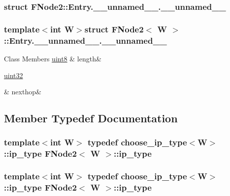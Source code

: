 \subsubsection{struct F\-Node2\-:\-:Entry.\-\_\-\-\_\-unnamed\-\_\-\-\_\-.\-\_\-\-\_\-unnamed\-\_\-\-\_\-}
\subsubsection*{template$<$int W$>$struct F\-Node2$<$ W $>$\-::\-Entry.\-\_\-\-\_\-unnamed\-\_\-\-\_\-.\-\_\-\-\_\-unnamed\-\_\-\-\_\-}

\begin{DoxyFields}{Class Members}
\hypertarget{structFNode2_a2fa47f7c65fec19cc163b195725e3844}{\hyperlink{types_8h_a34ecedcf03a70dc91e4616212d79267d}{uint8}}\label{structFNode2_a2fa47f7c65fec19cc163b195725e3844}
&
length&
\\
\hline

\hypertarget{structFNode2_acd89a5ed2bdc1b5e6183409f0c056ee2}{\hyperlink{types_8h_abd01e8e67e3d94cab04ecaaf4f85ac1b}{uint32}}\label{structFNode2_acd89a5ed2bdc1b5e6183409f0c056ee2}
&
nexthop&
\\
\hline

\end{DoxyFields}


\subsection{Member Typedef Documentation}
\hypertarget{structFNode2_ab28e88113ab341b42bc43259be0f7dd5}{
\subsubsection[{ip\-\_\-type}]{\setlength{\rightskip}{0pt plus 5cm}template$<$int W$>$ typedef {\bf choose\-\_\-ip\-\_\-type}$<${\bf W}$>$\-::{\bf ip\-\_\-type} {\bf F\-Node2}$<$ {\bf W} $>$\-::{\bf ip\-\_\-type}}}\label{structFNode2_ab28e88113ab341b42bc43259be0f7dd5}
\hypertarget{structFNode2_ab28e88113ab341b42bc43259be0f7dd5}{
\subsubsection[{ip\-\_\-type}]{\setlength{\rightskip}{0pt plus 5cm}template$<$int W$>$ typedef {\bf choose\-\_\-ip\-\_\-type}$<${\bf W}$>$\-::{\bf ip\-\_\-type} {\bf F\-Node2}$<$ {\bf W} $>$\-::{\bf ip\-\_\-type}}}\label{structFNode2_ab28e88113ab341b42bc43259be0f7dd5}


